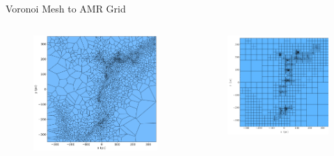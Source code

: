 \documentclass[aspectratio=169]{beamer}
\begin{document}
\begin{frame}{Voronoi Mesh to AMR Grid} %
    \begin{columns}
        \begin{column}{0.3\textwidth}
            \begin{figure}[h!]
                \centering
                \includegraphics[width=\linewidth]{../images/voronoi_mesh.png}
                \label{fig:voronoi_example}
            \end{figure}
        \end{column}
        \begin{column}{0.3\textwidth}
            \begin{figure}[h!]
                \centering
                \includegraphics[width=\linewidth]{../images/amr_grid_from_voronoi.png}

\end{figure}
\end{column}
\end{columns}
\end{frame}
\end{document}
